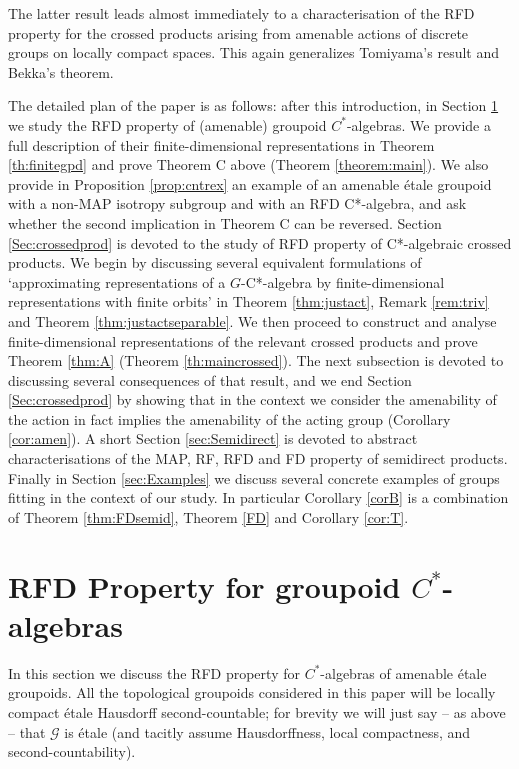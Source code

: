 \documentclass[11 pt, leqno, hidelinks]{amsart}%
\theoremstyle{plain}
\numberwithin{equation}{section}
\newcommand{\GG}{\mathcal{G}}
\begin{document}
The latter result leads almost immediately to a characterisation of the RFD property for the crossed products arising from amenable actions of discrete groups on locally compact spaces.  This again generalizes Tomiyama's result and Bekka's theorem.

\medskip

The detailed plan of the paper is as follows: after this introduction, in Section \ref{Sec:grpd} we study the RFD property of (amenable) groupoid $C^*$-algebras. We provide a full description of their finite-dimensional representations in Theorem \ref{th:finitegpd} and prove Theorem C above (Theorem \ref{theorem:main}).  We also provide in Proposition \ref{prop:cntrex} an example of an amenable \'etale groupoid with a non-MAP isotropy subgroup and with an RFD C*-algebra, and ask whether the second implication in Theorem C can be reversed.  Section \ref{Sec:crossedprod} is devoted to the study of RFD property of C*-algebraic crossed products. We begin by discussing several equivalent formulations of `approximating representations of a $G$-C*-algebra by finite-dimensional representations with finite orbits' in Theorem \ref{thm:justact}, Remark 	\ref{rem:triv}  and Theorem \ref{thm:justactseparable}. We then proceed to construct and analyse finite-dimensional representations of the relevant crossed products and prove Theorem \ref{thm:A} (Theorem \ref{th:maincrossed}). The next subsection is devoted to discussing several consequences of that result, and we end Section \ref{Sec:crossedprod} by showing that in the context we consider the amenability of the action in fact implies the amenability of the acting group (Corollary \ref{cor:amen}). A short Section \ref{sec:Semidirect} is devoted to abstract characterisations of the MAP, RF, RFD and FD property of semidirect products. Finally in Section \ref{sec:Examples} we discuss several concrete examples of groups fitting in the context of our study.  In particular Corollary \ref{corB} is a combination of Theorem \ref{thm:FDsemid}, Theorem \ref{FD} and Corollary \ref{cor:T}.



\section{RFD Property for groupoid $C^*$-algebras}\label{Sec:grpd}




In this section we discuss the RFD property for $C^*$-algebras of amenable \'etale groupoids. All the topological groupoids considered in this paper will be locally compact \'etale Hausdorff second-countable; for brevity we will just say -- as above -- that $\GG$ is \'etale (and tacitly assume Hausdorffness, local compactness, and second-countability).
\end{document}

